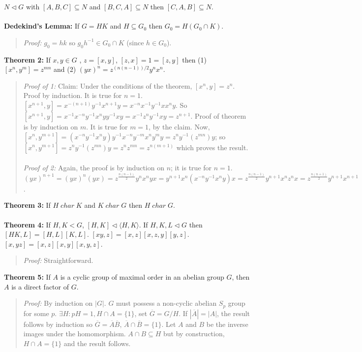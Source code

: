 $N \lhd G$ with
$[A,B,C] \subseteq N$ and
$[B,C,A] \subseteq N$ then
$[C,A,B] \subseteq N$.
\\
\\
{\bf Dedekind's Lemma:}  If $G=HK$ and $H \subseteq G_0$ then $G_0 = H(G_0 \cap K)$.
\begin{quote}
\emph {Proof:}
$g_0=hk$ so $g_0 h^{-1} \in G_0 \cap K$ (since $h \in G_0$).
\end{quote}
{\bf Theorem 2:}  If $x,y \in G$ , $z=[x,y]$, $[z, x]=1=[z,y]$ then (1) $[x^n, y^m]=z^{mn}$ and
(2) $(yx)^n= z^{(n(n-1))/2}y^n x^n$.
\begin{quote}
\emph {Proof of 1:} Claim: Under the conditions of the theorem, $[x^n,y]= z^n$.  Proof by induction.
It is true for $n=1$.  $[x^{n+1},y]= x^{-(n+1)}y^{-1}x^{n+1}y= x^{-n}x^{-1} y^{-1} x x^n y$.
So $[x^{n+1},y]= x^{-1} x^{-n} y^{-1} x^n y y^{-1} x y= x^{-1} z^n y^{-1} x y= z^{n+1}$.
Proof of theorem is by induction on $m$.  It is true for $m=1$, by the claim.  Now,
$[x^n,y^{m+1}]= (x^{-n} y^{-1} x^n y) y^{-1} x^{-n} y^{-m} x^n y^m y= z^n y^{-1} (z^{mn}) y$;
so $[x^n,y^{m+1}]= z^n y^{-1} (z^{mn}) y = z^n z^{mn}= z^{n(m+1)}$ which proves the result.
\\
\\
\emph {Proof of 2:} Again, the proof is by induction on $n$; it is true for $n=1$.
$(yx)^{n+1}= (yx)^n (yx)=
z^{\frac {n(n-1)} {2}} y^n x^n y x= y^{n+1} x^n (x^{-n} y^{-1} x^n y) x
= z^{\frac {n(n-1)} {2}} y^{n+1} x^n z^n x= z^{\frac {n(n+1)} 2} y^{n+1} x^{n+1}$.
\end{quote}
{\bf Theorem 3:}
If  $H \; char \; K$ and $K \;  char \; G$ then $H \; char \; G$.
\\
\\
{\bf Theorem 4:}
If $H, K < G$, $[H,K] \lhd \langle H, K \rangle$.
If $H, K, L \lhd G$ then $[HK,L]= [H,L] [K, L]$.
$[xy,z]= [x,z] [x,z,y] [y,z]$.
$[x, yz]= [x,z] [x,y] [x,y,z]$.
\begin{quote}
\emph{Proof:}
Straightforward.
\end{quote}
{\bf Theorem 5:}
If $A$ is a cyclic group of maximal order in an abelian group $G$, then $A$ is a direct
factor of $G$.
\begin{quote}
\emph{Proof:}  By induction on $|G|$.
$G$ must possess a non-cyclic abelian $S_p$ group for some $p$.
$\exists H: pH=1, H \cap A = \{ 1 \}$, set ${\overline G}= G/H$.
If $|{\overline A}|= |A|$, the result follows by induction so
${\overline G} = {\overline A} {\overline B}$,
${\overline A} \cap {\overline B} = \{ 1 \}$.  Let $A$ and $B$ be the inverse images
under the homomorphism.  $A \cap B \subseteq H$ but by construction, $H \cap A= \{ 1 \}$
and the result follows.
\end{quote}

